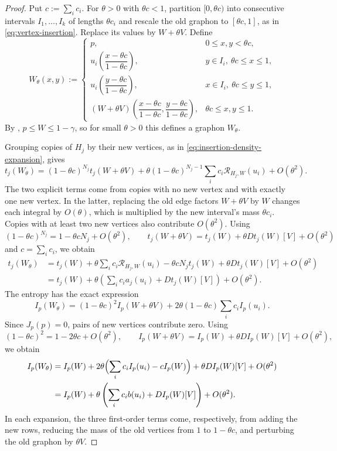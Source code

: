 \begin{proof}
Put $c:=\sum_ic_i$.  For $\theta>0$ with $\theta c<1$, partition
$[0,\theta c)$ into consecutive intervals $I_1,\dots,I_k$ of lengths $\theta c_i$ and
rescale the old graphon to $[\theta c,1]$, as in
\eqref{eq:vertex-insertion}.  Replace its values by $W+\theta V$.
Define
\[
  W_\theta(x,y):=
  \begin{cases}
    p, & 0\le x,y<\theta c,\\
    u_i\!\left(\dfrac{x-\theta c}{1-\theta c}\right),
      & y\in I_i,\ \theta c\le x\le1,\\
    u_i\!\left(\dfrac{y-\theta c}{1-\theta c}\right),
      & x\in I_i,\ \theta c\le y\le1,\\
    (W+\theta V)\!\left(\dfrac{x-\theta c}{1-\theta c},
                          \dfrac{y-\theta c}{1-\theta c}\right),
      & \theta c\le x,y\le1.
  \end{cases}
\]
By , $p\le W\le1-\gamma$, so for small
$\theta>0$ this defines a graphon $W_\theta$.

Grouping copies of $H_j$ by their new vertices, as in
\eqref{eq:insertion-density-expansion}, gives
\[
  t_j(W_\theta) =(1-\theta c)^{N_j}t_j(W+\theta V)+\theta(1-\theta c)^{N_j-1}
  \sum_ic_i\mathcal R_{H_j,W}(u_i)+O(\theta^2).
\]
The two explicit terms come from copies with no new vertex and with
exactly one new vertex.  In the latter, replacing the old edge factors
$W+\theta V$ by $W$ changes each integral by $O(\theta)$, which is
multiplied by the new interval's mass $\theta c_i$.
Copies with at least two new vertices also contribute $O(\theta^2)$.
Using
\[
  (1-\theta c)^{N_j}=1-\theta cN_j+O(\theta^2),\qquad
  t_j(W+\theta V)=t_j(W)+\theta Dt_j(W)[V]+O(\theta^2)
\]
and $c=\sum_i c_i$, we obtain
\begin{align*}
    t_j(W_\theta)
    &=t_j(W)+\theta\sum_i c_i\mathcal R_{H_j,W}(u_i)-\theta cN_jt_j(W)
      +\theta Dt_j(W)[V]+O(\theta^2)\\
    &=t_j(W)+\theta \left( \sum_i c_i a_j(u_i) + Dt_j(W)[V] \right) +O(\theta^2).
\end{align*}
The entropy has the exact expression
\[
  I_p(W_\theta)=(1-\theta c)^2I_p(W+\theta V)
  +2\theta(1-\theta c)\sum_ic_i I_p(u_i).
\]
Since $J_p(p)=0$, pairs of new vertices contribute zero.
Using
\[
  (1-\theta c)^2=1-2\theta c+O(\theta^2),\qquad
  I_p(W+\theta V)=I_p(W)+\theta DI_p(W)[V]+O(\theta^2),
\]
we obtain
\begin{align*}
    I_p(W_\theta)
    &=I_p(W)+2\theta\Bigl(\sum_i c_i I_p(u_i)-cI_p(W)\Bigr)
      +\theta DI_p(W)[V]+O(\theta^2)\\
    &=I_p(W)+\theta \left( \sum_i c_i b(u_i) + DI_p(W)[V] \right) +O(\theta^2).
\end{align*}
In each expansion, the three first-order terms come, respectively,
from adding the new rows, reducing the mass of the old vertices from
$1$ to $1-\theta c$, and perturbing the old graphon by $\theta V$.
\end{proof}

